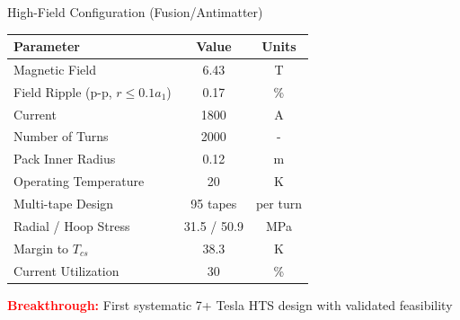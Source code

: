 \documentclass[aspectratio=169,xcolor={table,dvipsnames}]{beamer}
\newcommand{\highlight}[1]{\textcolor{red}{\textbf{#1}}}
\begin{document}
\begin{frame}{High-Field Configuration (Fusion/Antimatter)}
    \begin{table}[h]
        \centering
        \begin{tabular}{lcc}
            \toprule
            \textbf{Parameter} & \textbf{Value} & \textbf{Units} \\
            \midrule
            Magnetic Field & 6.43 & T \\
            Field Ripple (p-p, $r\le0.1a_1$) & 0.17 & \% \\
            Current & 1800 & A \\
            Number of Turns & 2000 & - \\
            Pack Inner Radius & 0.12 & m \\
            Operating Temperature & 20 & K \\
            Multi-tape Design & 95 tapes & per turn \\
            Radial / Hoop Stress & 31.5 / 50.9 & MPa \\
            Margin to $T_{cs}$ & 38.3 & K \\
            Current Utilization & 30 & \% \\
            \bottomrule
        \end{tabular}
    \end{table}
    
    \highlight{Breakthrough:} First systematic 7+ Tesla HTS design with validated feasibility
\end{frame}
\end{document}
